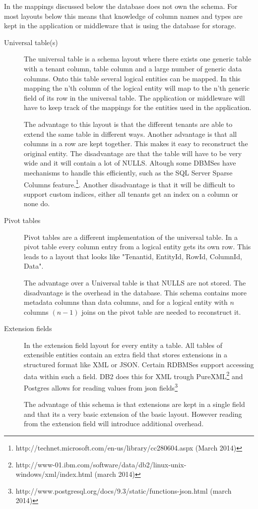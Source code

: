 In the mappings discussed below the database does not own the schema. 
For most layouts below this means that knowledge of column names and types are kept in the application or middleware that is using the database for storage. 
\begin{description}
	\item[Universal table(s)]
		The universal table is a schema layout where there exists one generic table with a tenant column, table column and a large number of generic data columns.
		Onto this table several logical entities can be mapped.
		In this mapping the n'th column of the logical entity will map to the n'th generic field of its row in the universal table.
		The application or middleware will have to keep track of the mappings for the entities used in the application.

		The advantage to this layout is that the different tenants are able to extend the same table in different ways. 
		Another advantage is that all columns in a row are kept together. 
		This makes it easy to reconstruct the original entity.
		The disadvantage are that the table will have to be very wide and it will contain a lot of NULLS. 
		Altough some DBMSes have mechanisms to handle this efficiently, such as the SQL Server Sparse Columns feature.\footnote{http://technet.microsoft.com/en-us/library/cc280604.aspx (March 2014)}.
		Another disadvantage is that it will be difficult to support custom indices, either all tenants get an index on a column or none do.\cite{aulbach2008multi}
	\item[Pivot tables]
		Pivot tables are a different implementation of the universal table.
		In a pivot table every column entry from a logical entity gets its own row. 
		This leads to a layout that looks like "Tenantid, EntityId, RowId, ColumnId, Data".

		The advantage over a Universal table is that NULLS are not stored.
		The disadvantage is the overhead in the database. 
		This schema contains more metadata columns than data columns, and for a logical entity with $n$ columns $(n-1)$ joins on the pivot table are needed to reconstruct it.\cite{aulbach2008multi}
	\item[Extension fields]
		In the extension field layout for every entity a table.
		All tables of extensible entities contain an extra field that stores extensions in a structured format like XML or JSON.
		Certain RDBMSes support accessing data within such a field. 
		DB2 does this for XML trough PureXML\footnote{http://www-01.ibm.com/software/data/db2/linux-unix-windows/xml/index.html (march 2014)} and Postgres allows for reading values from json fields\footnote{http://www.postgresql.org/docs/9.3/static/functions-json.html (march 2014)}

		The advantage of this schema is that extensions are kept in a single field and that its a very basic extension of the basic layout.
		However reading from the extension field will introduce additional overhead.\cite{aulbach2009comparison}
\end{description}

